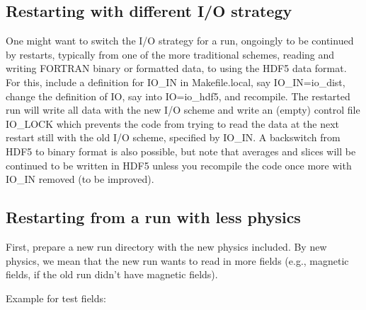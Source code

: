 \documentclass[\mydriver,12pt,twoside,notitlepage,a4paper]{article}
\begin{document}
\subsection{Restarting with different I/O strategy}
\label{RestartinigDiffIOg}
One might want to switch the I/O strategy for a run, ongoingly to be continued
by restarts, typically from one of the more traditional schemes, reading and
writing FORTRAN binary or formatted data, to using the HDF5 data format.
For this, include a definition for IO_IN in Makefile.local, say IO_IN=io_dist,
change the definition of IO, say into IO=io_hdf5, and recompile. The restarted run
will write all data with the new I/O scheme and write an (empty) control file
IO_LOCK which prevents the code from trying to read the data at the next restart
still with the old I/O scheme, specified by IO_IN.
A backswitch from HDF5 to binary format is also possible, but note that averages
and slices will be continued to be written in HDF5 unless you recompile the code
once more with IO_IN removed
(to be improved).


\subsection{Restarting from a run with less physics}
\label{RestartingFromLessPhysics}

First, prepare a new run directory with the new physics included.
By new physics, we mean that the new run wants to read in more fields
(e.g., magnetic fields, if the old run didn't have magnetic fields).

Example for test fields:
\end{document}
